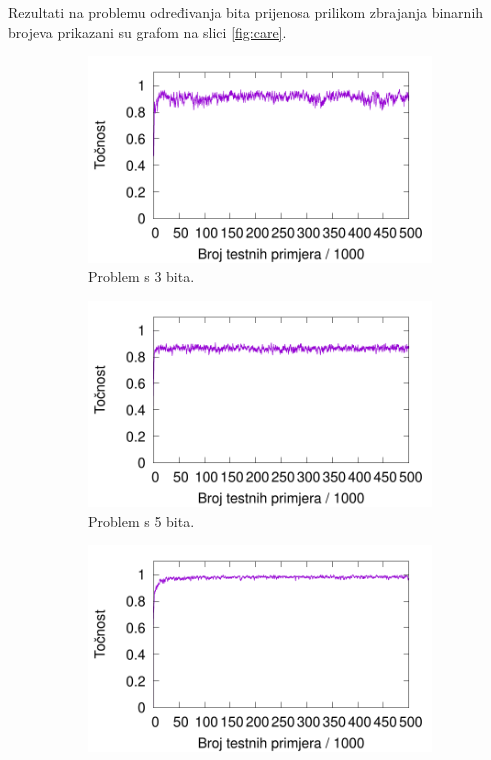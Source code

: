 \documentclass[times, utf8, zavrsni]{fer}
\begin{document}
Rezultati na problemu određivanja bita prijenosa prilikom zbrajanja binarnih brojeva prikazani su grafom na slici \ref{fig:care}.

\begin{figure}
    \centering
    \begin{subfigure}{0.496\textwidth}
        \centering
        \includegraphics[width=\textwidth]{img/majority/3majre.pdf}
        \caption{Problem s 3 bita.}
        \label{fig:3majre}
    \end{subfigure}
    \begin{subfigure}{0.496\textwidth}
        \centering
        \includegraphics[width=\textwidth]{img/majority/5majre.pdf}
        \caption{Problem s 5 bita.}
        \label{fig:5majre}
    \end{subfigure}
    \begin{subfigure}{0.496\textwidth}
        \centering
        \includegraphics[width=\textwidth]{img/majority/7majre.pdf}

\end{subfigure}
\end{figure}
\end{document}
